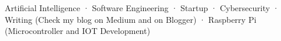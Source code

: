 
\begin{cvinterests}
    {Artificial Intelligence · Software Engineering · Startup · Cybersecurity · }
    {Writing (Check my blog on Medium and on Blogger) · Raspberry Pi (Microcontroller and IOT Development)}
\end{cvinterests}
